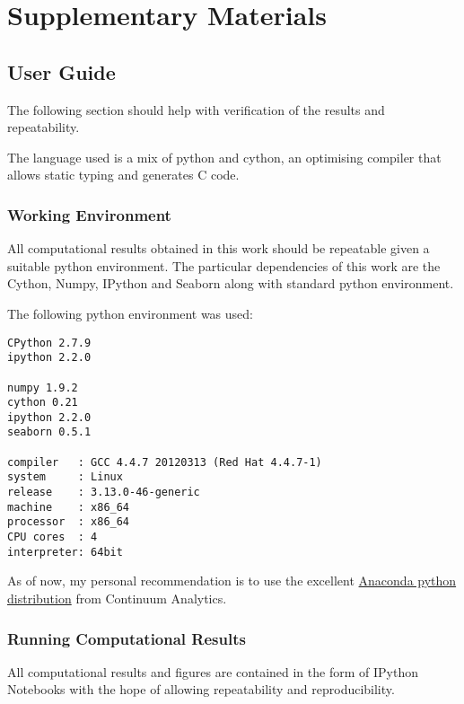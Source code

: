\documentclass{article} %
\begin{document}
{




\newpage
\section{Supplementary Materials}

\subsection{User Guide}
\label{user_guide}

The following section should help with verification of the results and repeatability.\newline

The language used is a mix of python and cython, an optimising compiler that allows static typing and generates C code.


\subsubsection{Working Environment}
All computational results obtained in this work should be repeatable given a suitable python environment. The particular dependencies of this work are the Cython, Numpy, IPython and Seaborn along with standard python environment.\newline

The following python environment was used:

\begin{verbatim}
CPython 2.7.9
ipython 2.2.0

numpy 1.9.2
cython 0.21
ipython 2.2.0
seaborn 0.5.1

compiler   : GCC 4.4.7 20120313 (Red Hat 4.4.7-1)
system     : Linux
release    : 3.13.0-46-generic
machine    : x86_64
processor  : x86_64
CPU cores  : 4
interpreter: 64bit

\end{verbatim}

As of now, my personal recommendation is to use the excellent \href{http://continuum.io/downloads}{Anaconda python distribution} from Continuum Analytics.


\subsubsection{Running Computational Results}

All computational results and figures are contained in the form of IPython Notebooks with the hope of allowing repeatability and reproducibility.


}
\end{document}
